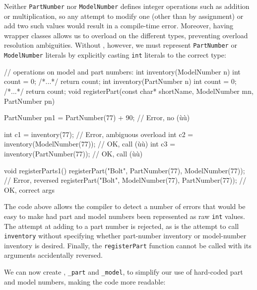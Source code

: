 \noindent Neither \lstinline!PartNumber! nor \lstinline!ModelNumber! defines integer
operations such as addition or multiplication, so any attempt to modify
one (other than by assignment) or add two such values would result in a
compile-time error. Moreover, having wrapper classes allows us to
overload on the different types, preventing overload resolution
ambiguities. Without , however, we must represent
\lstinline!PartNumber! or \lstinline!ModelNumber! literals by explicitly
casting \lstinline!int! literals to the correct type:

\begin{emcppslisting}[emcppsbatch=e14]
// operations on model and part numbers:
int inventory(ModelNumber n) { int count = 0; /*...*/ return count; }
int inventory(PartNumber n)  { int count = 0; /*...*/ return count; }
void registerPart(const char* shortName, ModelNumber mn, PartNumber pn) { }

PartNumber pn1 = PartNumber(77) + 90;  // Error, no (ù{}ù)

int c1 = inventory(77);               // Error, ambiguous overload
int c2 = inventory(ModelNumber(77));  // OK, call (ù{}ù)
int c3 = inventory(PartNumber(77));   // OK, call (ù{}ù)

void registerParts1()
{
    registerPart("Bolt", PartNumber(77), ModelNumber(77));  // Error, reversed
    registerPart("Bolt", ModelNumber(77), PartNumber(77));  // OK, correct args
}
\end{emcppslisting}
    
\noindent The code above allows the compiler to detect a number of errors that
would be easy to make had part and model numbers been represented as raw
\lstinline!int! values. The attempt at adding to a part number is rejected,
as is the attempt to call \lstinline!inventory! without specifying whether
part-number inventory or model-number inventory is desired. Finally, the
\lstinline!registerPart! function cannot be called with its arguments
accidentally reversed.

We can now create , \lstinline!_part! and
\lstinline!_model!, to simplify our use of hard-coded part and model
numbers, making the code more readable:

